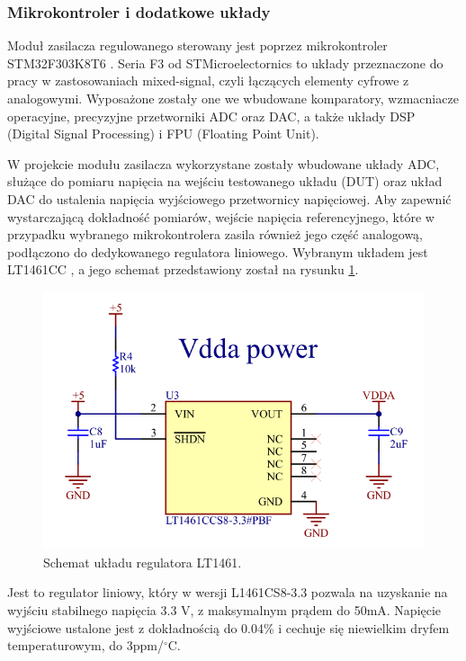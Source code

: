 \subsubsection{Mikrokontroler i dodatkowe układy}

Moduł zasilacza regulowanego sterowany jest poprzez mikrokontroler STM32F303K8T6 \cite{stm32f303}. 
Seria F3 od STMicroelectornics to układy przeznaczone do pracy w zastosowaniach mixed-signal, czyli 
łączących elementy cyfrowe z analogowymi. Wyposażone zostały one we wbudowane komparatory, wzmacniacze
operacyjne, precyzyjne przetworniki ADC oraz DAC, a także układy DSP (Digital Signal Processing) i 
FPU (Floating Point Unit). 

W projekcie modułu zasilacza wykorzystane zostały wbudowane układy ADC, służące do pomiaru napięcia na wejściu
testowanego układu (DUT) oraz układ DAC do ustalenia napięcia wyjściowego przetwornicy napięciowej.
Aby zapewnić wystarczającą dokładność pomiarów, wejście napięcia referencyjnego, które w przypadku
wybranego mikrokontrolera zasila również jego część analogową, podłączono do dedykowanego regulatora liniowego.
Wybranym układem jest LT1461CC \cite{lt1461}, a jego schemat przedstawiony został na rysunku \ref{fig:lt1461}.

\begin{figure}[h!]
    \begin{center}
        \includegraphics[width = 13cm]{images/lt1461_2.png}
        \caption{Schemat układu regulatora LT1461.}
        \label{fig:lt1461}
    \end{center}
\end{figure}

Jest to regulator liniowy, który w wersji L1461CS8-3.3 pozwala na uzyskanie na wyjściu stabilnego
napięcia 3.3 V, z maksymalnym prądem do 50mA. Napięcie wyjściowe ustalone jest z dokładnością do 
0.04\% i cechuje się niewielkim dryfem temperaturowym, do 3ppm/$^{\circ}$C.


